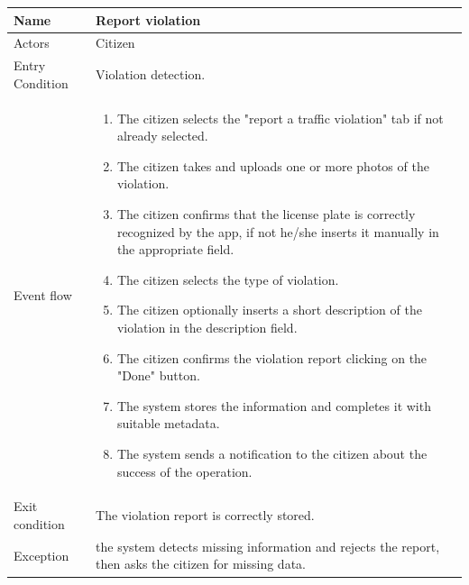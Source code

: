 \vskip 0.2in
\begin{tabular}{|p{3.1cm}|p{11.6cm}|}
\hline
Name & Report violation\\
\hline
Actors & Citizen\\
\hline
Entry Condition & Violation detection.\\
\hline
Event flow & \begin{enumerate}
                \item The citizen selects the "report a traffic violation" tab if not already selected.
                \item The citizen takes and uploads one or more photos of the violation.
                \item The citizen confirms that the license plate is correctly recognized by the app, if not he/she inserts it manually in the appropriate field.
                \item The citizen selects the type of violation.
                \item The citizen optionally inserts a short description of the violation in the description field.
                \item The citizen confirms the violation report clicking on the "Done" button.
                \item The system stores the information and completes it with suitable metadata.
                \item The system sends a notification to the citizen about the success of the operation.
            \end{enumerate}\\
\hline
Exit condition & The violation report is correctly stored.\\
\hline
Exception & the system detects missing information and rejects the report, then asks the citizen for missing data.\\
\hline
\end{tabular}

